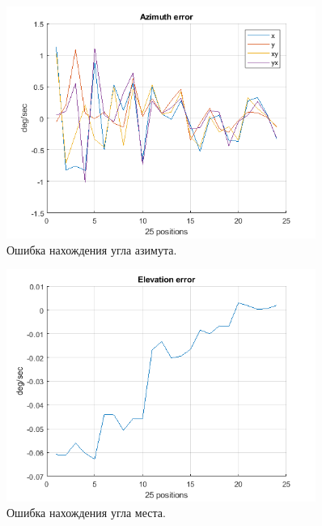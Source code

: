 \documentclass[a4paper,12pt]{article}
\begin{document}
\begin{figure}[h] 
\centering
\includegraphics[width=0.9\textwidth]{Azim_err.png} 
\caption{\label{fig:Azim} Ошибка нахождения угла азимута.}
\end{figure}

\begin{figure}[h] 
\centering
\includegraphics[width=0.9\textwidth]{Elev_err.png} 
\caption{\label{fig:Elev} Ошибка нахождения угла места.}
\end{figure}
\end{document}

